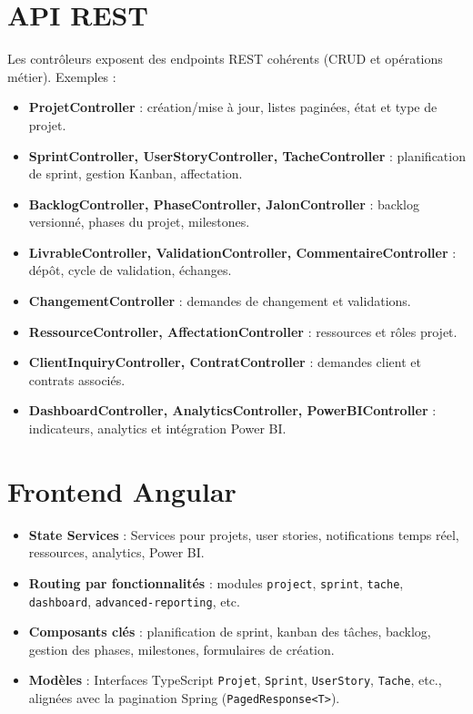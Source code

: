 \section{API REST}
Les contrôleurs exposent des endpoints REST cohérents (CRUD et opérations métier). Exemples :
\begin{itemize}
  \item \textbf{ProjetController} : création/mise à jour, listes paginées, état et type de projet.
  \item \textbf{SprintController, UserStoryController, TacheController} : planification de sprint, gestion Kanban, affectation.
  \item \textbf{BacklogController, PhaseController, JalonController} : backlog versionné, phases du projet, milestones.
  \item \textbf{LivrableController, ValidationController, CommentaireController} : dépôt, cycle de validation, échanges.
  \item \textbf{ChangementController} : demandes de changement et validations.
  \item \textbf{RessourceController, AffectationController} : ressources et rôles projet.
  \item \textbf{ClientInquiryController, ContratController} : demandes client et contrats associés.
  \item \textbf{DashboardController, AnalyticsController, PowerBIController} : indicateurs, analytics et intégration Power BI.
\end{itemize}

\section{Frontend Angular}
\begin{itemize}
  \item \textbf{State \/ Services} : Services pour projets, user stories, notifications temps réel, ressources, analytics, Power BI.
  \item \textbf{Routing par fonctionnalités} : modules \texttt{project}, \texttt{sprint}, \texttt{tache}, \texttt{dashboard}, \texttt{advanced-reporting}, etc.
  \item \textbf{Composants clés} : planification de sprint, kanban des tâches, backlog, gestion des phases, milestones, formulaires de création.
  \item \textbf{Modèles} : Interfaces TypeScript \texttt{Projet}, \texttt{Sprint}, \texttt{UserStory}, \texttt{Tache}, etc., alignées avec la pagination Spring (\texttt{PagedResponse<T>}).
\end{itemize}

